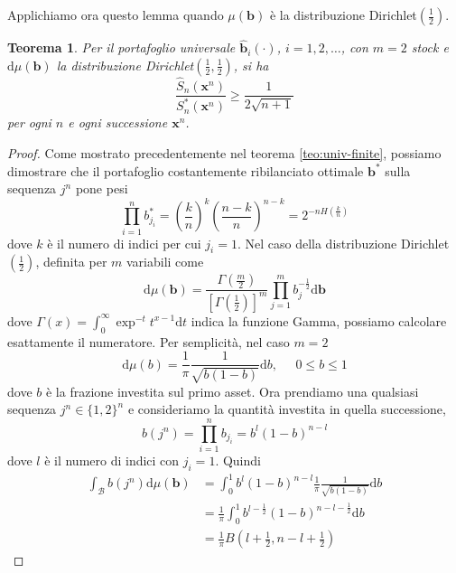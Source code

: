 \documentclass[a4paper,11pt]{book}
\theoremstyle{plain}
\newtheorem{teo}{Teorema}[chapter]
\theoremstyle{definition}
\theoremstyle{remark}
\newcommand{\dt}{\text{d}t}
\newcommand{\x}{\bm{x}}
\newcommand{\B}{\bm{b}}
\newcommand{\bh}{\hat{\bm{b}}}
\newcommand{\Sh}{\hat{S}}
\newcommand{\dmu}{\text{d}\mu(\B)}
\begin{document}
Applichiamo ora questo lemma quando $\mu(\B)$ è la distribuzione Dirichlet$\left(\frac{1}{2}\right)$.
\begin{teo}
	Per il portafoglio universale $\bh_i(\cdot)$, $i = 1,2,\ldots$, con $m = 2$ stock e $\dmu$ la distribuzione Dirichlet$\left(\frac{1}{2},\frac{1}{2}\right)$, si ha
	\begin{equation*}
		\frac{\Sh_n(\x^n)}{S_n^*(\x^n)}\geq \frac{1}{2\sqrt{n+1}}
	\end{equation*}
	per ogni $n$ e ogni successione $\x^n$.
\end{teo}
\begin{proof}
	Come mostrato precedentemente nel teorema \ref{teo:univ-finite}, possiamo dimostrare che il portafoglio costantemente ribilanciato ottimale $\B^*$ sulla sequenza $j^n$ pone pesi
	\begin{equation*}
		\prod_{i = 1}^n{b^*_{j_i}}=\left(\frac{k}{n}\right)^k\left(\frac{n-k}{n}\right)^{n-k} = 2^{-nH\left(\frac{k}{n}\right)}
	\end{equation*}
	dove $k$ è il numero di indici per cui $j_i =1$. Nel caso della distribuzione Dirichlet$\left(\frac{1}{2}\right)$, definita per $m$ variabili come
	\begin{equation*}
		\dmu = \frac{\Gamma\left(\frac{m}{2}\right)}{\left[\Gamma\left(\frac{1}{2}\right)\right]^m}\prod_{j =1}^m{b_j^{-\frac{1}{2}}}\text{d}\B
	\end{equation*}
	dove $\Gamma(x) = \int_0^\infty{\exp^{-t}t^{x-1}\dt}$ indica la funzione Gamma, possiamo calcolare esattamente il numeratore. Per semplicità, nel caso $m = 2$
	\begin{equation*}
		\text{d}\mu(b) = \frac{1}{\pi}\frac{1}{\sqrt{b(1-b)}}\text{d}b, \;\;\;\;\; 0\leq b\leq 1
	\end{equation*}
	dove $b$ è la frazione investita sul primo asset. Ora prendiamo una qualsiasi sequenza $j^n\in \{1,2\}^n$ e consideriamo la quantità investita in quella successione,
	\begin{equation*}
		b(j^n) =\prod_{i = 1}^n{b_{j_i}}= b^l(1-b)^{n-l}
	\end{equation*}
	dove $l$ è il numero di indici con $j_i=1$. Quindi
	\begin{equation*}
		\begin{split}
		\int_\mathcal{B}{b(j^n)}\dmu& = \int_{0}^1{b^l(1-b)^{n-l}\frac{1}{\pi}\frac{1}{\sqrt{b(1-b)}}\text{d}b}\\
		&= \frac{1}{\pi}\int_{0}^{1}{b^{l-\frac{1}{2}}(1-b)^{n-l-\frac{1}{2}}\text{d}b}\\
		& = \frac{1}{\pi}B\left(l+\frac{1}{2},n-l+\frac{1}{2}\right)

\end{split}
\end{equation*}
\end{proof}
\end{document}
